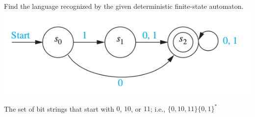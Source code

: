 \documentclass[../main.tex]{subfiles}
\begin{document}
Find the language recognized by the given deterministic finite-state automaton. \\
\includegraphics[width=\textwidth]{img/Q13_3_17}

\solution
The set of bit strings that start with $0$, $10$, or $11$;
i.e., $\{0, 10, 11\}\{0, 1\}^\ast$
\end{document}
